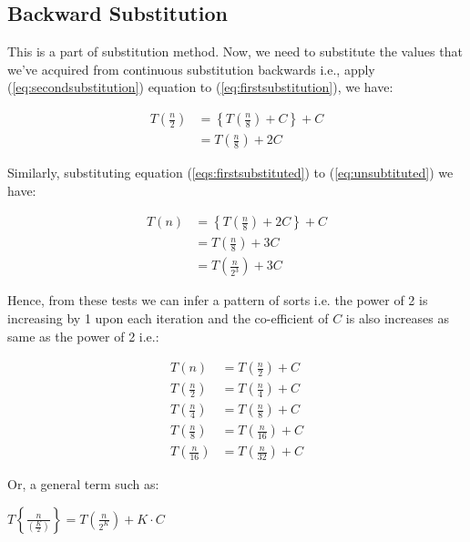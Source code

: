 \documentclass[a4paper,12pt]{article}
\theoremstyle{definition}
\begin{document}
    \subsection*{Backward Substitution}

    \noindent
    This is a part of substitution method.
    Now, we need to substitute the values that we've acquired from continuous substitution backwards i.e., apply
    (\ref{eq:secondsubstitution}) equation to (\ref{eq:firstsubstitution}), we have:

    \begin{align}
        \label{eqs:firstsubstituted}
        T\left(\frac{n}{2}\right) & = \left\{T\left(\frac{n}{8}\right) + C\right\} + C \\
        & = T\left(\frac{n}{8}\right) + 2C
    \end{align}

    \noindent
    Similarly, substituting equation (\ref{eqs:firstsubstituted}) to (\ref{eq:unsubtituted}) we have:

    \begin{align}
        T(n) & = \left\{T\left(\frac{n}{8}\right) + 2C\right\} + C \\
        & = T\left(\frac{n}{8}\right) + 3C                    \\
        & = T\left(\frac{n}{2^3}\right) + 3C
    \end{align}

    \noindent
    Hence, from these tests we can infer a pattern of sorts i.e. the power of 2 is increasing by 1 upon each
    iteration and the co-efficient of $C$ is also increases as same as the power of 2 i.e.:

    \begin{align*}
        T(n)                       & = T\left(\frac{n}{2}\right) + C  \\
        T\left(\frac{n}{2}\right)  & = T\left(\frac{n}{4}\right) + C  \\
        T\left(\frac{n}{4}\right)  & = T\left(\frac{n}{8}\right) + C  \\
        T\left(\frac{n}{8}\right)  & = T\left(\frac{n}{16}\right) + C \\
        T\left(\frac{n}{16}\right) & = T\left(\frac{n}{32}\right) + C
    \end{align*}

    \noindent
    Or, a general term such as:

    \begin{center}
        $T\left\{\frac{n}{\left(\frac{K}{2}\right)}\right\} = T\left(\frac{n}{2^K}\right) + K \cdot C$
    \end{center}
\end{document}
